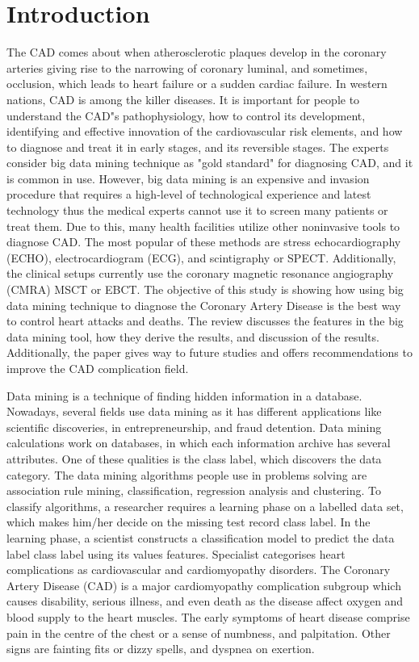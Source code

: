 \documentclass[sigconf]{acmart}
\begin{document}
\section{Introduction}
The CAD comes about when atherosclerotic plaques develop in the coronary arteries giving rise to the narrowing of coronary luminal, and sometimes, occlusion, which leads to heart failure or a sudden cardiac failure. In western nations, CAD is among the killer diseases. It is important for people to understand the CAD"s pathophysiology, how to control its development, identifying and effective innovation of the cardiovascular risk elements, and how to diagnose and treat it in early stages, and its reversible stages. The experts consider big data mining technique as "gold standard" for diagnosing CAD, and it is common in use. However, big data mining is an expensive and invasion procedure that requires a high-level of technological experience and latest technology thus the medical experts cannot use it to screen many patients or treat them.  Due to this, many health facilities utilize other noninvasive tools to diagnose CAD. The most popular of these methods are stress echocardiography (ECHO), electrocardiogram (ECG), and scintigraphy or SPECT. Additionally, the clinical setups currently use the coronary magnetic resonance angiography (CMRA) MSCT or EBCT. The objective of this study is showing how using big data mining technique to diagnose the Coronary Artery Disease is the best way to control heart attacks and deaths. The review discusses the features in the big data mining tool, how they derive the results, and discussion of the results. Additionally, the paper gives way to future studies and offers recommendations to improve the CAD complication field. 
\par Data mining is a technique of finding hidden information in a database. Nowadays, several fields use data mining as it has different applications like scientific discoveries, in entrepreneurship, and fraud detention. Data mining calculations work on databases, in which each information archive has several attributes.  One of these qualities is the class label, which discovers the data category. The data mining algorithms people use in problems solving are association rule mining, classification, regression analysis and clustering.
To classify algorithms, a researcher requires a learning phase on a labelled data set, which makes him/her decide on the missing test record class label. In the learning phase, a scientist constructs a classification model to predict the data label class label using its values features. Specialist categorises heart complications as cardiovascular and cardiomyopathy disorders. The Coronary Artery Disease (CAD) is a major cardiomyopathy complication subgroup which causes disability, serious illness, and even death as the disease affect oxygen and blood supply to the heart muscles. The early symptoms of heart disease comprise pain in the centre of the chest or a sense of numbness, and palpitation. Other signs are fainting fits or dizzy spells, and dyspnea on exertion. 
\end{document}
